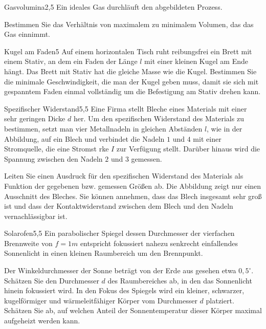 


\begin{problem}{Gasvolumina}{2,5}
Ein ideales Gas durchläuft den abgebildeten Prozess.


Bestimmen Sie das Verhältnis von maximalem zu minimalem Volumen, das das Gas einnimmt.
 \begin{solution}
  
 \end{solution}
\end{problem}

\begin{problem}{Kugel am Faden}{5}
Auf einem horizontalen Tisch ruht reibungsfrei ein Brett mit einem Stativ, an dem ein Faden der Länge $l$ mit einer kleinen Kugel am Ende hängt.  Das Brett mit Stativ hat die gleiche Masse wie die Kugel.
Bestimmen Sie die minimale Geschwindigkeit, die man der Kugel geben muss, damit sie sich mit gespanntem Faden einmal vollständig um die Befestigung am Stativ drehen kann.
\end{problem}

\begin{problem}{Spezifischer Widerstand}{5,5}
Eine Firma stellt Bleche eines Materials mit einer sehr geringen Dicke $d$ her.  Um den spezifischen Widerstand des Materials zu bestimmen, setzt man vier Metallnadeln in gleichen Abständen $l$, wie in der Abbildung, auf ein Blech und verbindet die Nadeln $1$ und $4$ mit einer Stromquelle, die eine Stromst rke $I$ zur Verfügung stellt.  Darüber hinaus wird die Spannung zwischen den Nadeln $2$ und $3$ gemessen.

Leiten Sie einen Ausdruck für den spezifischen Widerstand des Materials als Funktion der gegebenen bzw. gemessen Größen ab.  Die Abbildung zeigt nur einen Ausschnitt des Bleches.  Sie können annehmen, dass das Blech insgesamt sehr groß ist und dass der Kontaktwiderstand zwischen dem Blech und den Nadeln vernachlässigbar ist.
\end{problem}

\begin{problem}{Solarofen}{5,5}
Ein parabolischer Spiegel dessen Durchmesser der vierfachen Brennweite von $f=1\unit{m}$ entspricht fokussiert nahezu senkrecht einfallendes Sonnenlicht in einen kleinen Raumbereich um den Brennpunkt.

\begin{abcenum}
  \item Der Winkeldurchmesser der Sonne beträgt von der Erde aus gesehen etwa $0,5^{\circ}$.  Schätzen Sie den Durchmesser $d$ des Raumbereiches ab, in den das Sonnenlicht hinein fokussiert wird.
  \itme In den Fokus des Spiegels wird ein kleiner, schwarzer, kugelförmiger und wärmeleitfähiger Körper vom Durchmesser $d$ platziert.  Schätzen Sie ab, auf welchen Anteil der Sonnentemperatur dieser Körper maximal aufgeheizt werden kann.
\end{abcenum}
\end{problem}

